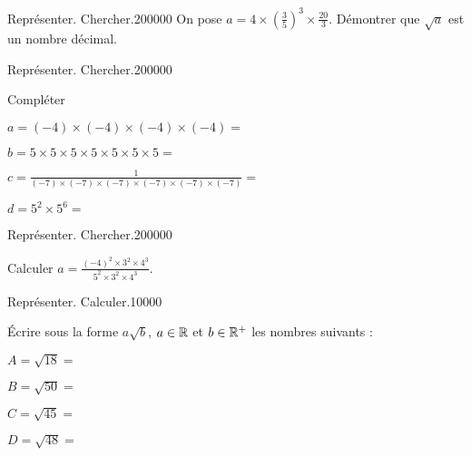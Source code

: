\begin{pageParcoursu}
\begin{ExoCu}{Représenter. Chercher.}{2}{0}{0}{0}{0}{0}
On pose $a=4\times \left(\frac{3}{5}\right)^3 \times \frac{20}{3}$. Démontrer que $\sqrt{a}$ est un nombre décimal.
\end{ExoCu}


\begin{ExoCu}{Représenter. Chercher.}{2}{0}{0}{0}{0}{0}

Compléter \vspace{0.4cm}

\begin{minipage}{0.48\linewidth}
$a= (-4) \times (-4)\times (-4) \times (-4)  =$  
 
$b= 5 \times 5\times 5 \times 5 \times 5\times 5 \times 5  =$  
\end{minipage}
\vrule
\begin{minipage}{0.48\linewidth}
$c= \frac{1}{(-7) \times (-7)\times (-7) \times (-7)\times (-7) \times (-7)}  =$  
 
$d= 5^2 \times 5^6  =$  
\end{minipage}
\end{ExoCu}



\begin{ExoCu}{Représenter. Chercher.}{2}{0}{0}{0}{0}{0}

Calculer $a= \frac{(-4)^2\times 3^2\times 4^3 }{5^2\times 3^2\times 4^3} $.  

\end{ExoCu}

\begin{ExoCuN}{Représenter. Calculer.}{1}{0}{0}{0}{0}

Écrire sous la forme $a\sqrt{b}$, $a\in\mathbb R$ et $b \in \mathbb R^+$ les nombres suivants : \vspace{0.4cm}

\begin{minipage}{0.5\linewidth}
$A = \sqrt{18}=$  

$B=\sqrt{50}=$  

\end{minipage}
\vrule
\begin{minipage}{0.5\linewidth}
$C=\sqrt{45}=$    

$D=\sqrt{48}=$  
\end{minipage}
 
\end{ExoCuN}


 


\end{pageParcoursu} %
 
